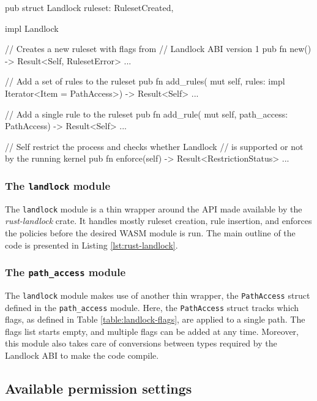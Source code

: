 \begin{code}[language=Rust, caption=The outline of the \texttt{landlock} module., label=lst:rust-landlock]
pub struct Landlock {
  ruleset: RulesetCreated,
}

impl Landlock {
  // Creates a new ruleset with flags from
  // Landlock ABI version 1
  pub fn new() -> Result<Self, RulesetError> {...}

  // Add a set of rules to the ruleset
  pub fn add_rules(
    mut self,
    rules: impl Iterator<Item = PathAccess>)
    -> Result<Self>
  {...}

  // Add a single rule to the ruleset
  pub fn add_rule(
    mut self,
    path_access: PathAccess) -> Result<Self>
  {...}

  // Self restrict the process and checks whether Landlock
  // is supported or not by the running kernel
  pub fn enforce(self) -> Result<RestrictionStatus>
  {...}
}
\end{code}

\subsubsection{The \texttt{landlock} module}

The \texttt{landlock} module is a thin wrapper around the API made available by the \textit{rust-landlock} crate.
It handles mostly ruleset creation, rule insertion, and enforces the policies before the desired WASM module is run.
The main outline of the code is presented in Listing \ref{lst:rust-landlock}.

\subsubsection{The \texttt{path\_access} module}

The \texttt{landlock} module makes use of another thin wrapper, the \texttt{PathAccess} struct defined
in the \texttt{path\_access} module.
Here, the \texttt{PathAccess} struct tracks which flags, as defined in Table \ref{table:landlock-flags},
are applied to a single path. The flags list starts empty, and multiple flags can be added at any time.
Moreover, this module also takes care of conversions between types required by the Landlock ABI to make the code compile.

\subsection{Available permission settings}

